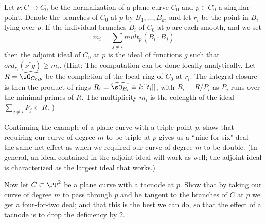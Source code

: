 \begin{exercise}
Let $\nu : C \to C_0$ be the normalization of a plane curve $C_0$ and $p \in C_0$ a singular point. Denote the branches of $C_0$ at $p$ by $B_1,\dots,B_k$, and let $r_i$ be the point in $B_i$ lying over $p$. If the individual branches $B_i$ of $C_0$ at $p$ are each smooth, and we set
$$
m_i = \sum_{j \neq i} mult_p(B_i \cdot B_j)
$$
then the adjoint ideal of $C_0$ at $p$ is the ideal of functions $g$ such that $ord_{r_i}(\nu^*g) \geq m_i$.
(Hint: The computation can be done locally analytically. Let $R = \widehat{\sO_{C_0, p}}$ be the completion of the local ring
of $C_0$ at $r_i$. The integral closure is then the product of rings $R_i = \widehat{\sO_{B_i}} \cong k[[t_i]]$,
with $R_i = R/P_i$ as $P_j$ runs over the minimal primes of $R$. The multiplicity
$m_i$ is the colength of the ideal $\sum_{j\neq i}P_j \subset R$.
)
\end{exercise}
\begin{exercise}
Continuing the example of a plane curve with a triple point $p$, show that requiring our curve of degree $m$ to be triple at $p$ gives us a ``nine-for-six" deal---the same net effect as when we required our curve of degree $m$ to be double. (In general, an ideal contained in the adjoint ideal will work as well; the adjoint ideal is characterized as the largest ideal that works.)
\end{exercise}

\begin{exercise}
Now let $C \subset \PP^2$ be a plane curve with a tacnode at $p$. Show that by taking our curve of degree $m$ to pass through $p$ and be tangent to the branches of $C$ at $p$ we get a four-for-two deal; and that this is the best we can do, so that the effect of a tacnode is to drop the deficiency by 2.
\end{exercise}


